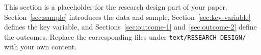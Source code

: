 
This section is a placeholder for the research design part of your paper.
Section~\ref{sec:sample} introduces the data and sample,
Section~\ref{sec:key-variable} defines the key variable, and
Sections~\ref{sec:outcome-1} and~\ref{sec:outcome-2} define the outcomes.
Replace the corresponding files under \texttt{text/RESEARCH DESIGN/} with
your own content.

